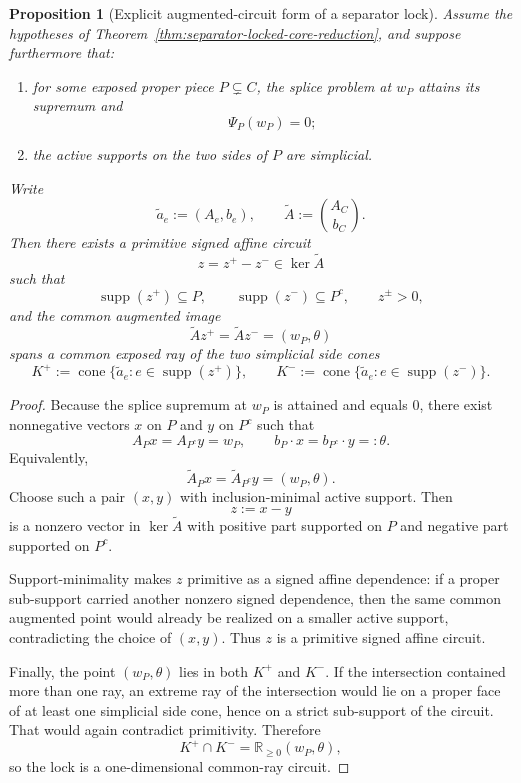 \documentclass[11pt]{article}
\newtheorem{proposition}[theorem]{Proposition}
\theoremstyle{definition}
\newcommand{\supp}{\operatorname{supp}}
\newcommand{\R}{\mathbb{R}}
\newcommand{\1}{\mathbf{1}}
\begin{document}
\begin{proposition}[Explicit augmented-circuit form of a separator lock]\label{prop:separator-lock-augmented-circuit}
Assume the hypotheses of Theorem~\ref{thm:separator-locked-core-reduction}, and suppose furthermore that:
\begin{enumerate}[label=(\roman*),leftmargin=2.2em]
\item for some exposed proper piece $P\subsetneq C$, the splice problem at $w_P$ attains its supremum and
\[
\Psi_P(w_P)=0;
\]
\item the active supports on the two sides of $P$ are simplicial.
\end{enumerate}
Write
\[
\widetilde a_e:=(A_e,b_e),
\qquad
\widetilde A:=\binom{A_C}{b_C}.
\]
Then there exists a primitive signed affine circuit
\[
z=z^+-z^-\in \ker \widetilde A
\]
such that
\[
\supp(z^+)\subseteq P,\qquad
\supp(z^-)\subseteq P^c,\qquad
z^\pm>0,
\]
and the common augmented image
\[
\widetilde A z^+=\widetilde A z^-=(w_P,\theta)
\]
spans a common exposed ray of the two simplicial side cones
\[
K^+:=\operatorname{cone}\{\widetilde a_e:e\in \supp(z^+)\},
\qquad
K^-:=\operatorname{cone}\{\widetilde a_e:e\in \supp(z^-)\}.
\]
\end{proposition}

\begin{proof}
Because the splice supremum at $w_P$ is attained and equals $0$, there exist nonnegative vectors $x$ on $P$ and $y$ on $P^c$ such that
\[
A_Px=A_{P^c}y=w_P,
\qquad
b_P\cdot x=b_{P^c}\cdot y=:\theta.
\]
Equivalently,
\[
\widetilde A_Px=\widetilde A_{P^c}y=(w_P,\theta).
\]
Choose such a pair $(x,y)$ with inclusion-minimal active support. Then
\[
z:=x-y
\]
is a nonzero vector in $\ker \widetilde A$ with positive part supported on $P$ and negative part supported on $P^c$.

Support-minimality makes $z$ primitive as a signed affine dependence: if a proper sub-support carried another nonzero signed dependence, then the same common augmented point would already be realized on a smaller active support, contradicting the choice of $(x,y)$. Thus $z$ is a primitive signed affine circuit.

Finally, the point $(w_P,\theta)$ lies in both $K^+$ and $K^-$. If the intersection contained more than one ray, an extreme ray of the intersection would lie on a proper face of at least one simplicial side cone, hence on a strict sub-support of the circuit. That would again contradict primitivity. Therefore
\[
K^+\cap K^-=\R_{\ge 0}(w_P,\theta),
\]
so the lock is a one-dimensional common-ray circuit.
\end{proof}
\end{document}
